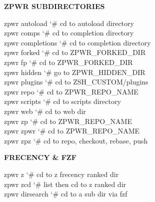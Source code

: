 \documentclass[11pt,a4paper,twoside]{book}
\begin{document}
\vspace{12pt}
{\bfseries\color{neonyellow} \textbf{ZPWR} SUBDIRECTORIES}\vspace{4pt}

\begin{codebox}
\color{neongreen}zpwr autoload              {\char`\#} cd to autoload directory\\
\color{neongreen}zpwr comps                 {\char`\#} cd to completion directory\\
\color{neongreen}zpwr completions           {\char`\#} cd to completion directory\\
\color{neongreen}zpwr forked                {\char`\#} cd to ZPWR\_FORKED\_DIR\\
\color{neongreen}zpwr fp                    {\char`\#} cd to ZPWR\_FORKED\_DIR\\
\color{neongreen}zpwr hidden                {\char`\#} go to ZPWR\_HIDDEN\_DIR\\
\color{neongreen}zpwr plugins               {\char`\#} cd to ZSH\_CUSTOM/plugins\\
\color{neongreen}zpwr repo                  {\char`\#} cd to ZPWR\_REPO\_NAME\\
\color{neongreen}zpwr scripts               {\char`\#} cd to scripts directory\\
\color{neongreen}zpwr web                   {\char`\#} cd to web dir\\
\color{neongreen}zpwr zp                    {\char`\#} cd to ZPWR\_REPO\_NAME\\
\color{neongreen}zpwr zpwr                  {\char`\#} cd to ZPWR\_REPO\_NAME\\
\color{neongreen}zpwr zpz                   {\char`\#} cd to repo, checkout, rebase, push\\
\end{codebox}


\vspace{12pt}
{\bfseries\color{neonyellow} FRECENCY \& FZF}\vspace{4pt}

\begin{codebox}
\color{neongreen}zpwr z                     {\char`\#} cd to z frecency ranked dir\\
\color{neongreen}zpwr zcd                   {\char`\#} list then cd to z ranked dir\\
\color{neongreen}zpwr dirsearch             {\char`\#} cd to a sub dir via fzf\\
\end{codebox}
\end{document}
